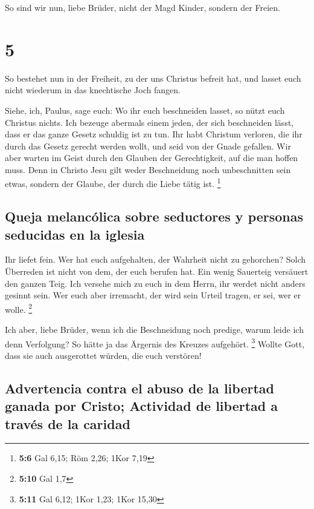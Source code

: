  So sind wir nun, liebe Brüder, nicht der Magd Kinder,
sondern der Freien.

\hypertarget{section-4}{%
\section{5}\label{section-4}}

 So bestehet nun in der Freiheit, zu der uns Christus
befreit hat, und lasset euch nicht wiederum in das knechtische Joch
fangen.

 Siehe, ich, Paulus, sage euch: Wo ihr euch beschneiden
lasset, so nützt euch Christus nichts.  Ich bezeuge
abermals einem jeden, der sich beschneiden lässt, dass er das ganze
Gesetz schuldig ist zu tun.  Ihr habt Christum verloren,
die ihr durch das Gesetz gerecht werden wollt, und seid von der Gnade
gefallen.  Wir aber warten im Geist durch den Glauben der
Gerechtigkeit, auf die man hoffen muss.  Denn in Christo
Jesu gilt weder Beschneidung noch unbeschnitten sein etwas, sondern der
Glaube, der durch die Liebe tätig ist. \footnote{\textbf{5:6} Gal 6,15;
  Röm 2,26; 1Kor 7,19}

\hypertarget{queja-melancuxf3lica-sobre-seductores-y-personas-seducidas-en-la-iglesia}{%
\subsection{Queja melancólica sobre seductores y personas seducidas en
la
iglesia}\label{queja-melancuxf3lica-sobre-seductores-y-personas-seducidas-en-la-iglesia}}

 Ihr liefet fein. Wer hat euch aufgehalten, der Wahrheit
nicht zu gehorchen?  Solch Überreden ist nicht von dem,
der euch berufen hat.  Ein wenig Sauerteig versäuert den
ganzen Teig.  Ich versehe mich zu euch in dem Herrn, ihr
werdet nicht anders gesinnt sein. Wer euch aber irremacht, der wird sein
Urteil tragen, er sei, wer er wolle. \footnote{\textbf{5:10} Gal 1,7}

 Ich aber, liebe Brüder, wenn ich die Beschneidung noch
predige, warum leide ich denn Verfolgung? So hätte ja das Ärgernis des
Kreuzes aufgehört. \footnote{\textbf{5:11} Gal 6,12; 1Kor 1,23; 1Kor
  15,30}  Wollte Gott, dass sie auch ausgerottet würden,
die euch verstören!

\hypertarget{advertencia-contra-el-abuso-de-la-libertad-ganada-por-cristo-actividad-de-libertad-a-travuxe9s-de-la-caridad}{%
\subsection{Advertencia contra el abuso de la libertad ganada por
Cristo; Actividad de libertad a través de la
caridad}\label{advertencia-contra-el-abuso-de-la-libertad-ganada-por-cristo-actividad-de-libertad-a-travuxe9s-de-la-caridad}}

